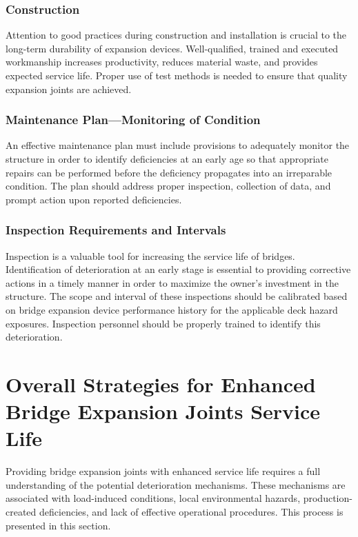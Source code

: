 \subsubsection{Construction}
Attention to good practices during construction and installation is crucial to the long-term durability of expansion devices. Well-qualified, trained and executed workmanship increases productivity, reduces material waste, and provides expected service life. Proper use of test methods is needed to ensure that quality expansion joints are achieved.

\subsubsection{Maintenance Plan—Monitoring of Condition}
An effective maintenance plan must include provisions to adequately monitor the structure in order to identify deficiencies at an early age so that appropriate repairs can be performed before the deficiency propagates into an irreparable condition. The plan should address proper inspection, collection of data, and prompt action upon reported deficiencies.

\subsubsection{Inspection Requirements and Intervals}
Inspection is a valuable tool for increasing the service life of bridges. Identification of deterioration at an early stage is essential to providing corrective actions in a timely manner in order to maximize the owner’s investment in the structure. The scope and interval of these inspections should be calibrated based on bridge expansion device performance history for the applicable deck hazard exposures. Inspection personnel should be properly trained to identify this deterioration.

\section{Overall Strategies for Enhanced Bridge Expansion Joints Service Life}\label{sec:strategy-joints-life}
Providing bridge expansion joints with enhanced service life requires a full understanding of the potential deterioration mechanisms. These mechanisms are associated with load-induced conditions, local environmental hazards, production-created deficiencies, and lack of effective operational procedures. This process is presented in this section.

